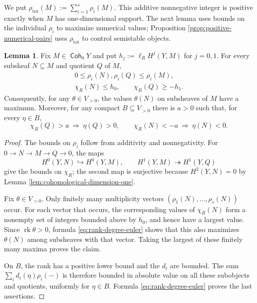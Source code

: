 \documentclass[a4paper,reqno]{amsart}
\DeclareMathOperator{\Coh}{\mathsf{Coh}}
\DeclareMathOperator{\rk}{rk}
\theoremstyle{definition}
\newtheorem{Lem}[Thm]{Lemma}
\begin{document}
We put $\rho_{\mathrm{tot}}(M):=\sum_{i=1}^s\rho_i(M)$. This additive nonnegative integer is positive exactly when $M$ has one-dimensional support. The next lemma uses bounds on the individual $\rho_i$ to maximize numerical values; Proposition \ref{prop:positive-numerical-pairs} uses $\rho_{\mathrm{tot}}$ to control semistable objects.

\begin{Lem}\label{lem:bounded-numerical-tests}
Fix $M\in\Coh_0Y$ and put $h_j:=\ell_R H^j(Y,M)$ for $j=0,1$. For every subsheaf $N\subseteq M$ and quotient $Q$ of $M$,
\[
\begin{gathered}
0\le\rho_i(N),\rho_i(Q)\le\rho_i(M),\\
\chi_R(N)\le h_0,\qquad\chi_R(Q)\ge-h_1.
\end{gathered}
\]
Consequently, for any $\theta\in V_{>0}$, the values $\theta(N)$ on subsheaves of $M$ have a maximum. Moreover, for any compact $B\subseteq V_{>0}$ there is $a>0$ such that, for every $\eta\in B$,
\[
\chi_R(Q)>a\ \Longrightarrow\ \eta(Q)>0,
\qquad
\chi_R(N)<-a\ \Longrightarrow\ \eta(N)<0.
\]
\end{Lem}
\begin{proof}
The bounds on $\rho_i$ follow from additivity and nonnegativity. For $0\to N\to M\to Q\to0$, the maps
\[
H^0(Y,N)\hookrightarrow H^0(Y,M),
\qquad H^1(Y,M)\twoheadrightarrow H^1(Y,Q)
\]
give the bounds on $\chi_R$; the second map is surjective because $H^2(Y,N)=0$ by Lemma \ref{lem:cohomological-dimension-one}.

Fix $\theta\in V_{>0}$. Only finitely many multiplicity vectors $(\rho_1(N),\ldots,\rho_s(N))$ occur. For each vector that occurs, the corresponding values of $\chi_R(N)$ form a nonempty set of integers bounded above by $h_0$, and hence have a largest value. Since $\rk\theta>0$, formula \eqref{eq:rank-degree-euler} shows that this also maximizes $\theta(N)$ among subsheaves with that vector. Taking the largest of these finitely many maxima proves the claim.

On $B$, the rank has a positive lower bound and the $d_i$ are bounded. The sum $\sum_i d_i(\eta)\rho_i(-)$ is therefore bounded in absolute value on all these subobjects and quotients, uniformly for $\eta\in B$. Formula \eqref{eq:rank-degree-euler} proves the last assertions.
\end{proof}
\end{document}
